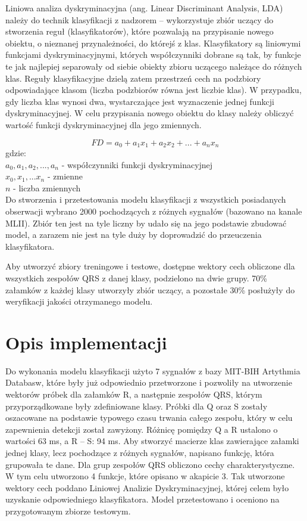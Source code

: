 \documentclass{article}
\begin{document}
 Liniowa analiza dyskryminacyjna (ang. Linear Discriminant Analysis, LDA) należy do technik klasyfikacji z nadzorem – wykorzystuje zbiór uczący do stworzenia reguł (klasyfikatorów), które pozwalają na przypisanie nowego obiektu, o nieznanej przynależności, do którejś z klas. Klasyfikatory są liniowymi funkcjami dyskryminacyjnymi, których współczynniki dobrane są tak, by funkcje te jak najlepiej separowały od siebie obiekty zbioru uczącego należące do różnych klas. Reguły klasyfikacyjne dzielą zatem przestrzeń cech na podzbiory odpowiadające klasom (liczba podzbiorów równa jest liczbie klas). W przypadku, gdy liczba klas wynosi dwa, wystarczające jest wyznaczenie jednej funkcji dyskryminacyjnej. W celu przypisania nowego obiektu do klasy należy obliczyć wartość funkcji dyskryminacyjnej dla jego zmiennych. 

 \[ FD = a_0 + a_1x_1 + a_2x_2 + ... + a_nx_n\]
 gdzie:\\
  \(a_0, a_1, a_2, ...,a_n\) - współczynniki funkcji dyskryminacyjnej\\ \(x_0, x_1, ...x_n\) - zmienne\\ \(n\) - liczba zmiennych\\
 
 Do stworzenia i przetestowania modelu klasyfikacji z wszystkich posiadanych obserwacji wybrano 2000 pochodzących z różnych sygnałów (bazowano na kanale MLII). Zbiór ten jest na tyle liczny by udało się na jego podstawie zbudować model, a zarazem nie jest na tyle duży by doprowadzić do przeuczenia klasyfikatora.
 
 Aby utworzyć zbiory treningowe i testowe, dostępne wektory cech obliczone dla wszystkich zespołów QRS z danej klasy, podzielono na dwie grupy. 70\% załamków z każdej klasy utworzyły zbiór uczący, a pozostałe 30\% posłużyły do weryfikacji jakości otrzymanego modelu.
 
 

\section{Opis implementacji}

Do wykonania modelu klasyfikacji użyto 7 sygnałów z bazy MIT-BIH Artythmia Databasw, które były już odpowiednio przetworzone i pozwoliły na utworzenie wektorów próbek dla załamków R, a następnie zespołów QRS, którym przyporządkowane były zdefiniowane klasy. Próbki dla Q oraz S zostały oszacowane na podstawie typowego czasu trwania całego zespołu, który w celu zapewnienia detekcji został zawyżony. Różnicę pomiędzy Q a R ustalono o wartości 63 ms, a R -- S: 94 ms. Aby stworzyć macierze klas zawierające załamki jednej klasy, lecz pochodzące z różnych sygnałów, napisano funkcję, która grupowała te dane. Dla grup zespołów QRS obliczono cechy charakterystyczne. W tym celu utworzono 4 funkcje, które opisano w akapicie 3. Tak utworzone wektory cech poddano Liniowej Analizie Dyskryminacyjnej, której celem było uzyskanie odpowiedniego klasyfikatora. Model przetestowano i oceniono na przygotowanym zbiorze testowym.
\end{document}
